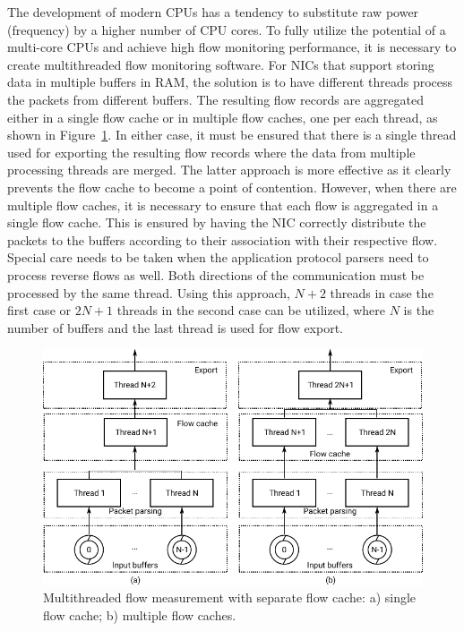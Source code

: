 The development of modern CPUs has a tendency to substitute raw power (frequency) by a higher number of CPU cores. To fully utilize the potential of a multi-core CPUs and achieve high flow monitoring performance, it is necessary to create multithreaded flow monitoring software. For NICs that support storing data in multiple buffers in RAM, the solution is to have different threads process the packets from different buffers. The resulting flow records are aggregated either in a single flow cache or in multiple flow caches, one per each thread, as shown in Figure~\ref{fig:exporter-thread-schema}. In either case, it must be ensured that there is a single thread used for exporting the resulting flow records where the data from multiple processing threads are merged. The latter approach is more effective as it clearly prevents the flow cache to become a point of contention. However, when there are multiple flow caches, it is necessary to ensure that each flow is aggregated in a single flow cache. This is ensured by having the NIC correctly distribute the packets to the buffers according to their association with their respective flow. Special care needs to be taken when the application protocol parsers need to process reverse flows as well. Both directions of the communication must be processed by the same thread. Using this approach, $N+2$ threads in case the first case or $2N+1$ threads in the second case can be utilized, where $N$ is the number of buffers and the last thread is used for flow export. 

\begin{figure}[t!]
  \begin{center}
    \includegraphics[width=\textwidth]{figures/exporter-thread-schema}
  \end{center}
  \caption{Multithreaded flow measurement with separate flow cache: a) single flow cache; b) multiple flow caches.}
  \label{fig:exporter-thread-schema}
\end{figure}


